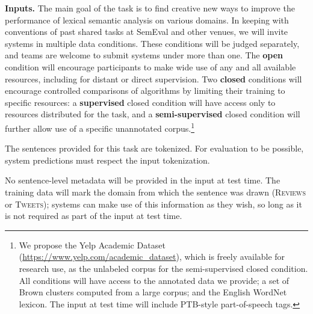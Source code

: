 \documentclass[11pt,letterpaper]{article}
\newcommand{\ensuretext}[1]{#1}
\newcommand{\nssmarker}{\ensuretext{\textcolor{magenta}{\ensuremath{^{\textsc{NS}}_{\textsc{S}}}}}}
\newcommand{\arkcomment}[3]{\ensuretext{\textcolor{#3}{[#1 #2]}}}
\newcommand{\nss}[1]{\arkcomment{\nssmarker}{#1}{magenta}}
\newcommand{\shortversion}[1]{}
\newcommand{\longversion}[1]{#1} %
\begin{document}
\textbf{Inputs.}
The main goal of the task is to find creative new ways to improve the performance of lexical semantic analysis on various domains. 
In keeping with conventions of past shared tasks at SemEval and other venues, 
we will invite systems in multiple data conditions.
These conditions will be judged separately, and teams are welcome to submit systems under more than one.
The \textbf{open} condition will encourage participants to make 
wide use of any and all available resources, including for 
distant or direct supervision. 
Two \textbf{closed} conditions will encourage controlled comparisons of algorithms 
by limiting their training to specific resources: 
a \textbf{supervised} closed condition will have access only to resources distributed for the task, 
and a \textbf{semi-supervised} closed condition will further allow use of a specific unannotated corpus.\footnote{%
We propose the Yelp Academic Dataset (\url{https://www.yelp.com/academic_dataset}), 
which is freely available for research use, as the unlabeled corpus for the semi-supervised closed condition.
All conditions will have access to the annotated data we provide; 
a set of Brown clusters \citep{brown-92} computed from a large corpus; and the \longversion{English }WordNet lexicon. 
The input at test time will include \longversion{PTB-style part-of-speech}\shortversion{POS} tags. 
\shortversion{No sentence-level metadata will be provided at test time, 
but the domain of the sentence will be marked in the training data.}}

\longversion{The sentences provided for this task are tokenized. 
For evaluation to be possible, system predictions must respect the input tokenization.}

\longversion{
No sentence-level metadata will be provided in the input at test time.
The training data will mark the domain from which the sentence was drawn 
(\textsc{Reviews} or \textsc{Tweets}); systems can make use of this information as they wish, 
so long as it is not required as part of the input at test time.}
\end{document}
